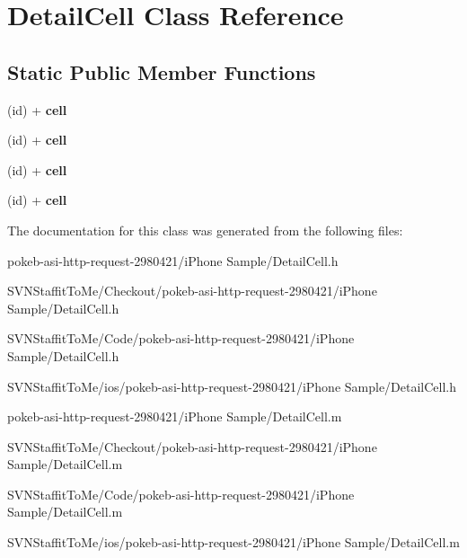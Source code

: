 \hypertarget{interface_detail_cell}{
\section{\-Detail\-Cell \-Class \-Reference}
\label{interface_detail_cell}
}
\subsection*{\-Static \-Public \-Member \-Functions}
\begin{DoxyCompactItemize}
\item 
\hypertarget{interface_detail_cell_afb8145ee104db9652f98cefae6377fd4}{
(id) + {\bfseries cell}}
\label{interface_detail_cell_afb8145ee104db9652f98cefae6377fd4}

\item 
\hypertarget{interface_detail_cell_afb8145ee104db9652f98cefae6377fd4}{
(id) + {\bfseries cell}}
\label{interface_detail_cell_afb8145ee104db9652f98cefae6377fd4}

\item 
\hypertarget{interface_detail_cell_afb8145ee104db9652f98cefae6377fd4}{
(id) + {\bfseries cell}}
\label{interface_detail_cell_afb8145ee104db9652f98cefae6377fd4}

\item 
\hypertarget{interface_detail_cell_afb8145ee104db9652f98cefae6377fd4}{
(id) + {\bfseries cell}}
\label{interface_detail_cell_afb8145ee104db9652f98cefae6377fd4}

\end{DoxyCompactItemize}


\-The documentation for this class was generated from the following files\-:\begin{DoxyCompactItemize}
\item 
pokeb-\/asi-\/http-\/request-\/2980421/i\-Phone Sample/\-Detail\-Cell.\-h\item 
\-S\-V\-N\-Staffit\-To\-Me/\-Checkout/pokeb-\/asi-\/http-\/request-\/2980421/i\-Phone Sample/\-Detail\-Cell.\-h\item 
\-S\-V\-N\-Staffit\-To\-Me/\-Code/pokeb-\/asi-\/http-\/request-\/2980421/i\-Phone Sample/\-Detail\-Cell.\-h\item 
\-S\-V\-N\-Staffit\-To\-Me/ios/pokeb-\/asi-\/http-\/request-\/2980421/i\-Phone Sample/\-Detail\-Cell.\-h\item 
pokeb-\/asi-\/http-\/request-\/2980421/i\-Phone Sample/\-Detail\-Cell.\-m\item 
\-S\-V\-N\-Staffit\-To\-Me/\-Checkout/pokeb-\/asi-\/http-\/request-\/2980421/i\-Phone Sample/\-Detail\-Cell.\-m\item 
\-S\-V\-N\-Staffit\-To\-Me/\-Code/pokeb-\/asi-\/http-\/request-\/2980421/i\-Phone Sample/\-Detail\-Cell.\-m\item 
\-S\-V\-N\-Staffit\-To\-Me/ios/pokeb-\/asi-\/http-\/request-\/2980421/i\-Phone Sample/\-Detail\-Cell.\-m\end{DoxyCompactItemize}
